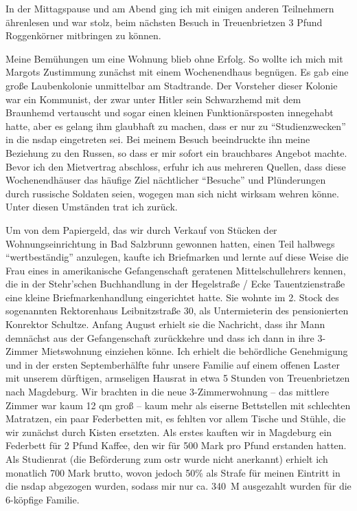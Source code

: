 In der Mittagspause und am Abend ging ich mit einigen anderen Teilnehmern ährenlesen und war stolz, beim nächsten Besuch in Treuenbrietzen 3 Pfund Roggenkörner mitbringen zu können.

Meine Bemühungen um eine Wohnung blieb ohne Erfolg. So wollte ich mich mit Margots Zustimmung zunächst mit einem Wochenendhaus begnügen. Es gab eine große Laubenkolonie unmittelbar am Stadtrande. Der Vorsteher dieser Kolonie war ein Kommunist, der zwar unter Hitler sein Schwarzhemd mit dem Braunhemd vertauscht und sogar einen kleinen Funktionärsposten innegehabt hatte, aber es gelang ihm glaubhaft zu machen, dass er nur zu \enquote{Studienzwecken} in die \ac{nsdap} eingetreten sei. Bei meinem Besuch beeindruckte ihn meine Beziehung zu den Russen, so dass er mir sofort ein brauchbares  Angebot machte. Bevor ich den Mietvertrag abschloss, erfuhr ich aus mehreren Quellen, dass diese Wochenendhäuser das häufige Ziel nächtlicher \enquote{Besuche} und Plünderungen durch russische Soldaten seien, wogegen man sich nicht wirksam wehren könne. Unter diesen Umständen trat ich zurück.

Um von dem Papiergeld, das wir durch Verkauf von Stücken der Wohnungseinrichtung in Bad Salzbrunn gewonnen hatten, einen Teil halbwegs \enquote{wertbeständig} anzulegen, kaufte ich Briefmarken und lernte auf diese Weise die Frau eines in amerikanische Gefangenschaft geratenen Mittelschullehrers kennen, die in der Stehr'schen Buchhandlung in der Hegelstraße / Ecke Tauentzienstraße eine kleine Briefmarkenhandlung eingerichtet hatte. Sie wohnte im 2. Stock des sogenannten Rektorenhaus Leibnitzstraße 30, als Untermieterin des pensionierten Konrektor Schultze. Anfang August erhielt sie die Nachricht, dass ihr Mann demnächst aus der Gefangenschaft zurückkehre und dass ich dann in ihre 3-Zimmer Mietswohnung einziehen könne. Ich erhielt die behördliche Genehmigung und in der ersten Septemberhälfte fuhr unsere Familie auf einem offenen Laster mit unserem dürftigen, armseligen Hausrat in etwa 5 Stunden von Treuenbrietzen nach Magdeburg. Wir brachten in die neue 3-Zimmerwohnung -- das mittlere Zimmer war kaum 12 qm groß -- kaum mehr als eiserne Bettstellen mit schlechten Matratzen, ein paar Federbetten mit, es fehlten vor allem Tische und Stühle, die wir zunächst durch Kisten ersetzten. Als erstes kauften wir in Magdeburg ein Federbett für 2 Pfund Kaffee, den wir für 500 Mark pro Pfund erstanden hatten. Als Studienrat (die Beförderung zum \ac{ostr} wurde nicht anerkannt) erhielt ich monatlich 700 Mark brutto, wovon jedoch 50\% als Strafe für meinen Eintritt in die \ac{nsdap} abgezogen wurden, sodass mir nur ca. 340~M ausgezahlt wurden für die 6-köpfige Familie.

